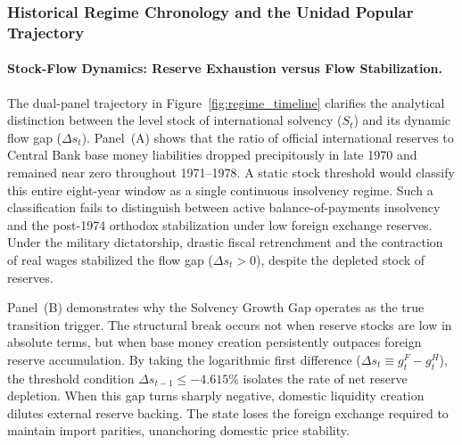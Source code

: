 \subsubsection{Historical Regime Chronology and the Unidad Popular Trajectory}
\label{sec:tvar_regime_chronology}

\paragraph{Stock-Flow Dynamics: Reserve Exhaustion versus Flow Stabilization.}
The dual-panel trajectory in Figure~\ref{fig:regime_timeline} clarifies the analytical distinction between the level stock of international solvency ($S_t$) and its dynamic flow gap ($\Delta s_t$). Panel~(A) shows that the ratio of official international reserves to Central Bank base money liabilities dropped precipitously in late 1970 and remained near zero throughout 1971--1978. A static stock threshold would classify this entire eight-year window as a single continuous insolvency regime. Such a classification fails to distinguish between active balance-of-payments insolvency and the post-1974 orthodox stabilization under low foreign exchange reserves. Under the military dictatorship, drastic fiscal retrenchment and the contraction of real wages stabilized the flow gap ($\Delta s_t > 0$), despite the depleted stock of reserves.

Panel~(B) demonstrates why the Solvency Growth Gap operates as the true transition trigger. The structural break occurs not when reserve stocks are low in absolute terms, but when base money creation persistently outpaces foreign reserve accumulation. By taking the logarithmic first difference ($\Delta s_t \equiv g^F_t - g^H_t$), the threshold condition $\Delta s_{t-1} \le -4.615\%$ isolates the rate of net reserve depletion. When this gap turns sharply negative, domestic liquidity creation dilutes external reserve backing. The state loses the foreign exchange required to maintain import parities, unanchoring domestic price stability.

